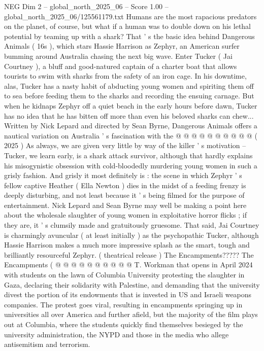 \begin{textsample}{NEG Dim 2 – global\_north\_2025\_06 – Score 1.00 – global\_north\_2025\_06/125561179.txt}  \label{ex:f2_neg_091}
Humans are the most rapacious predators on the planet, of course, but what if a human was to double down on his lethal potential by teaming up with a shark?
That ' s the basic idea behind Dangerous Animals ( 16s ), which stars Hassie Harrison as Zephyr, an American surfer bumming around Australia chasing the next big wave.
Enter Tucker ( Jai Courtney ), a bluff and good-natured captain of a charter boat that allows tourists to swim with sharks from the safety of an iron cage.
In his downtime, alas, Tucker has a nasty habit of abducting young women and spiriting them off to sea before feeding them to the sharks and recording the ensuing carnage.
But when he kidnaps Zephyr off a quiet beach in the early hours before dawn, Tucker has no idea that he has bitten off more than even his beloved sharks can chew...
Written by Nick Lepard and directed by Sean Byrne, Dangerous Animals offers a nautical variation on Australia ' s fascination with the @ @ @ @ @ @ @ @ @ @ ( 2025 ) As always, we are given very little by way of the killer ' s motivation -- Tucker, we learn early, is a shark attack survivor, although that hardly explains his misogynistic obsession with cold-bloodedly murdering young women in such a grisly fashion.
And grisly it most definitely is : the scene in which Zephyr ' s fellow captive Heather ( Ella Newton ) dies in the midst of a feeding frenzy is deeply disturbing, and not least because it ' s being filmed for the purpose of entertainment.
Nick Lepard and Sean Byrne may well be making a point here about the wholesale slaughter of young women in exploitative horror flicks ; if they are, it ' s clumsily made and gratuitously gruesome.
That said, Jai Courtney is charmingly avuncular ( at least initially ) as the psychopathic Tucker, although Hassie Harrison makes a much more impressive splash as the smart, tough and brilliantly resourceful Zephyr. ( theatrical release ) The Encampments?????
The Encampments ( @ @ @ @ @ @ @ @ @ @ T.
Workman that opens in April 2024 with students on the lawn of Columbia University protesting the slaughter in Gaza, declaring their solidarity with Palestine, and demanding that the university divest the portion of its endowments that is invested in US and Israeli weapons companies.
The protest goes viral, resulting in encampments springing up in universities all over America and further afield, but the majority of the film plays out at Columbia, where the students quickly find themselves besieged by the university administration, the NYPD and those in the media who allege antisemitism and terrorism.

\end{textsample}
